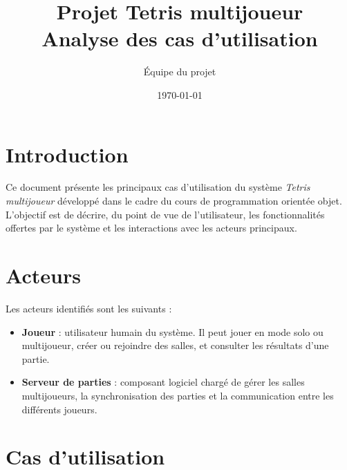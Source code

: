 \documentclass[a4paper,11pt]{article}
\title{Projet Tetris multijoueur\\\large Analyse des cas d'utilisation}
\author{Équipe du projet}
\date{\today}
\begin{document}
\maketitle

\section{Introduction}

Ce document présente les principaux cas d'utilisation du système
\emph{Tetris multijoueur} développé dans le cadre du cours de
programmation orientée objet. L'objectif est de décrire, du point de
vue de l'utilisateur, les fonctionnalités offertes par le système et
les interactions avec les acteurs principaux.

\section{Acteurs}

Les acteurs identifiés sont les suivants :

\begin{itemize}
  \item \textbf{Joueur} : utilisateur humain du système. Il peut jouer
        en mode solo ou multijoueur, créer ou rejoindre des salles,
        et consulter les résultats d'une partie.
  \item \textbf{Serveur de parties} : composant logiciel chargé de
        gérer les salles multijoueurs, la synchronisation des
        parties et la communication entre les différents joueurs.
\end{itemize}

\section{Cas d'utilisation}
\end{document}
